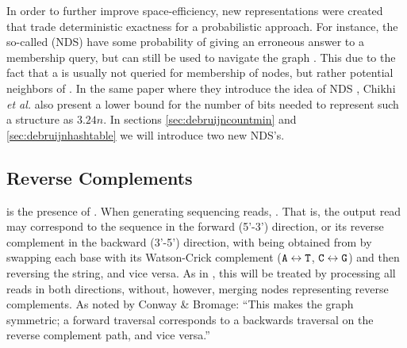 In order to further improve space-efficiency, new  representations were created that trade deterministic exactness for a probabilistic approach. For instance, the so-called  (NDS) have some probability of giving an erroneous answer to a membership query, 
but can still be used to navigate the graph \cite{Chikhi2014}. This  due to the fact that a \dBG is usually not queried for membership of  nodes, but rather  potential neighbors of . In the same paper where they introduce
the idea of NDS \cite{Chikhi2014}, Chikhi \emph{et al.} also present a lower bound for the number of bits needed to represent such a structure as $3.24n$.
In sections \ref{sec:debruijncountmin} and \ref{sec:debruijnhashtable} we will introduce two new NDS's. 

\subsection{Reverse Complements}

 is the presence of . When generating sequencing reads, . That is, the output read may correspond to the sequence  in the forward (5'-3') direction, or its reverse complement  in the backward (3'-5') direction, with
 being obtained from  by swapping each base with its Watson-Crick complement
($\mathtt{A} \leftrightarrow \mathtt{T}$, $\mathtt{C} \leftrightarrow \mathtt{G}$) and then reversing the string, and vice versa. 
As in \cite{Conway2011}, this will be treated by processing
all reads in both directions, without, however, merging nodes representing reverse complements. As noted by Conway \& Bromage: ``This
makes the graph symmetric; a forward traversal corresponds to a backwards traversal on the reverse complement path, and vice versa.'' 
\cite{Conway2011}



